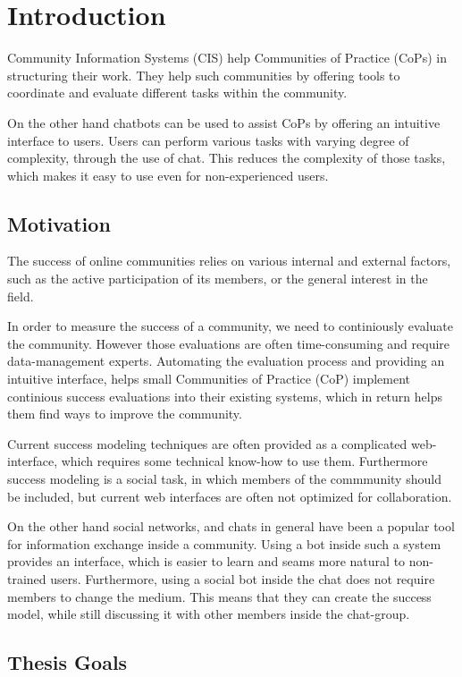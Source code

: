 \chapter{Introduction}
Community Information Systems (CIS) help Communities of Practice (CoPs) in structuring their work. They help such communities by offering tools to coordinate and evaluate different tasks within the community.

On the other hand chatbots can be used to assist CoPs by offering an intuitive interface to users. Users can perform various tasks with varying degree of complexity, through the use of chat. This reduces the complexity of those tasks, which makes it easy to use even for non-experienced users.

\section{Motivation}
The success of online communities relies on various internal and external factors, such as the active participation of its members, or the general interest in the field.

In order to measure the success of a community, we need to continiously evaluate the community. However those evaluations are often time-consuming and require data-management experts. Automating the evaluation process and providing an intuitive interface, helps small Communities of Practice (CoP) implement continious success evaluations into their existing systems, which in return helps them find ways to improve the community.

Current success modeling techniques are often provided as a complicated web-interface, which requires some technical know-how to use them. Furthermore success modeling is a social task, in which members of the commmunity should be included, but current web interfaces are often not optimized for collaboration.

On the other hand social networks, and chats in general have been a popular tool for information exchange inside a community. Using a bot inside such a system provides an interface, which is easier to learn and seams more natural to non-trained users. Furthermore, using a social bot inside the chat does not require members to change the medium. This means that they can create the success model, while still discussing it with other members inside the chat-group.

\newpage

\section{Thesis Goals}

